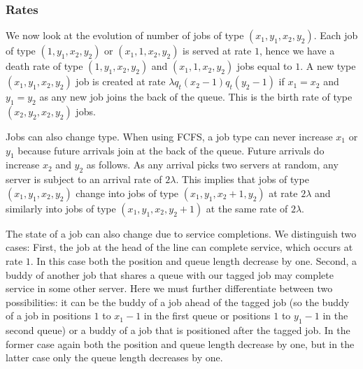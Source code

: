 \documentclass[acmsmall,nonacm]{acmart}
\begin{document}
\subsubsection{Rates}

We now look at the evolution of number of jobs of type $(x_1,y_1,x_2,y_2)$. Each job of type $(1,y_1,x_2,y_2)$ or $(x_1,1,x_2,y_2)$ is served at rate $1$, hence we have a death rate of type $(1,y_1,x_2,y_2)$ and $(x_1,1,x_2,y_2)$ jobs equal to $1$.  A new type $(x_1,y_1,x_2,y_2)$ job is created at rate $\lambda q_t(x_2-1)q_t(y_2-1)$
if $x_1=x_2$ and $y_1=y_2$ as any new job joins the back of the queue. This is the birth rate of type $(x_2,y_2,x_2,y_2)$ jobs.

Jobs can also change type.  When using FCFS, a job type can never increase $x_1$ or $y_1$ because future arrivals join at the back of the queue. Future arrivals do increase $x_2$ and $y_2$ as follows.
As any arrival picks two servers at random, any server is subject to an arrival rate of $2\lambda$.
This implies that jobs of type $(x_1,y_1,x_2,y_2)$ change into jobs of type
$(x_1,y_1,x_2+1,y_2)$ at rate $2\lambda$ and similarly into jobs of type $(x_1,y_1,x_2,y_2+1)$
at the same rate of $2 \lambda$.


The state of a job can also change due to service completions.
We distinguish two cases: First, the job at the head of the line can complete service, which occurs at rate $1$. In this case both the position and queue length decrease by one.
Second, a buddy of another job that shares a queue with our tagged job may complete service in some other server. Here we must further differentiate between two possibilities: it can be
the buddy of a job ahead of the tagged job (so the buddy of a job in positions $1$ to $x_1-1$
in the first queue or positions $1$ to $y_1-1$ in the second queue) or a buddy of a job that is 
positioned after the tagged job. In the former case again both the position and queue length
decrease by one, but in the latter case only the queue length decreases by one.
\end{document}
